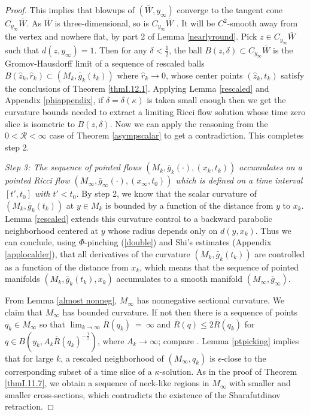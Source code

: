 \documentclass[12pt]{amsart}
\renewcommand{\r}{{\mathcal R}}
\newcommand{\ra}{\rightarrow}
\numberwithin{equation}{section}
\theoremstyle{plain}
\theoremstyle{definition}
\theoremstyle{remark}
\begin{document}
\begin{proof}
This implies that blowups of $(\bar W,y_\infty)$ converge
to the tangent cone $C_{y_\infty}\bar W$.
As $\overline{W}$ is three-dimensional, so is
$C_{y_\infty}\bar W$
\cite[Corollary 7.11]{Burago-Gromov-Perelman}.
It will be
$C^2$-smooth away from the vertex and nowhere flat, by 
part 2 of Lemma \ref{nearlyround}. 
Pick $z\in C_{y_\infty}\bar W $ such that $d(z,y_\infty)=1$.
Then 
for any $\delta < \frac12$, 
the ball $B(z,\delta)\subset C_{y_\infty}\bar W $
is the Gromov-Hausdorff limit of a sequence of 
rescaled balls 
$B(\widehat{z}_k,\widehat{r}_k)\subset (M_k,\bar g_k(t_k))$
where $\widehat{r}_k\ra 0$, whose center points $(\widehat{z}_k,t_k)$
satisfy the conclusions of Theorem 
\ref{thmI.12.1}.  Applying Lemma \ref{rescaled}
and Appendix \ref{phiappendix},
if $\delta = \delta(\kappa)$ is taken small enough then
we get the curvature bounds needed to extract a limiting
Ricci flow solution whose time zero slice is isometric
to $B(z,\delta)$.
Now we can apply
the reasoning from the $0<\r<\infty$ case of Theorem
\ref{asympscalar} to get a contradiction.  This completes step 2. 

\bigskip
{\em Step 3: The  sequence of pointed
flows $(M_k,\bar g_k(\cdot),(x_k,t_k))$ accumulates on a 
pointed Ricci flow $(M_\infty,\bar g_\infty(\cdot),(x_\infty,t_0))$
which is defined on a time interval $[t',t_0]$ with $t'< t_0$.}
By step 2, we know that the scalar curvature   of $(M_k,\bar g_k(t_k))$
at $y\in M_k$ is bounded by a function of  the distance from 
$y$ to $x_k$.
Lemma \ref{rescaled} extends this curvature control to a
backward parabolic neighborhood centered at $y$ whose radius depends only
on $d(y,x_k)$.  Thus we can conclude,
using $\Phi$-pinching (\ref{double}) and 
Shi's estimates (Appendix \ref{applocalder}),
that all derivatives of the
curvature $(M_k,\bar g_k(t_k))$ are controlled as a function
of the distance from $x_k$, which means that the 
sequence of pointed manifolds $(M_k,\bar g_k(t_k),x_k)$ accumulates
to a smooth manifold $(M_\infty,\bar g_\infty)$. 

From Lemma \ref{almost nonneg},
$M_\infty$ has nonnegative sectional curvature.
We claim that $M_\infty$ has bounded curvature.
If not then there is a sequence of points
$q_k \in M_\infty$ so that
$\lim_{k \rightarrow \infty} \overline{R}(q_k) \: = \: \infty$
and $\overline{R}(q) \le 2 \overline{R}(q_k)$ for
$q \in B(y_k, A_k \overline{R}(q_k)^{- \frac12})$, where
$A_k \rightarrow \infty$; compare \cite[Lemma 22.2]{Hamilton}.
Lemma \ref{ptpicking} implies that for large $k$, a rescaled neighborhood of
$(M_\infty, q_k)$ is $\epsilon$-close to the corresponding subset
of a time slice of a $\kappa$-solution. As in the proof of
Theorem \ref{thmI.11.7}, we obtain a sequence of neck-like regions 
in $M_\infty$ with smaller
and smaller cross-sections, which contradicts the
existence of the Sharafutdinov retraction.


\end{proof}
\end{document}
